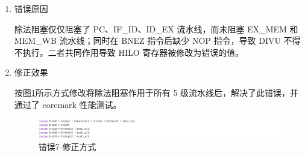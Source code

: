 \begin{enumerate}[(1)]
    \item 错误原因

除法阻塞仅仅阻塞了 PC、IF\_ID、ID\_EX 流水线，而未阻塞 EX\_MEM 和 MEM\_WB 流水线；同时在 BNEZ 指令后缺少 NOP 指令，导致 DIVU 不得不执行。二者共同作用导致 HILO 寄存器被修改为错误的值。
    
    \item 修正效果

按图\ref{fig:错误7-修正效果1}所示方式修改将除法阻塞作用于所有 5 级流水线后，解决了此错误，并通过了 coremark 性能测试。

\begin{figure}[H]
    \centering
    \includegraphics[width=\textwidth]{image/错误7-修正效果1.png}
    \caption{错误7-修正方式}
    \label{fig:错误7-修正效果1}
\end{figure}
    
\end{enumerate}
